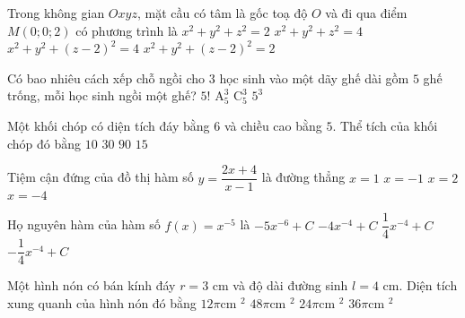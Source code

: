 \begin{ex}%
Trong không gian $Oxyz$, mặt cầu có tâm là gốc toạ độ $O$ và đi qua điểm $M(0; 0; 2)$ có phương trình là
\choice
{$x^2 + y^2 + z^2 = 2$}
{\True $x^2 + y^2 + z^2 = 4$}
{$x^2 + y^2 + (z-2)^2 = 4$}
{$x^2 + y^2 + (z-2)^2 = 2$}
\end{ex}
\begin{ex}%
Có bao nhiêu cách xếp chỗ ngồi cho $3$ học sinh vào một dãy ghế dài gồm $5$ ghế trống, mỗi học sinh ngồi một ghế?
\choice
{$5!$}
{\True $\mathrm{A}_5^3$}
{$\mathrm{C}_5^3$}
{$5^3$}
\end{ex}
\begin{ex}%
Một khối chóp có diện tích đáy bằng $6$ và chiều cao bằng $5$. Thể tích của khối chóp đó bằng
\choice
{\True $10$}
{$30$}
{$90$}
{$15$}
\end{ex}
\begin{ex}%
Tiệm cận đứng của đồ thị hàm số $y = \dfrac{2x + 4}{x - 1}$ là đường thẳng
\choice
{\True $x = 1$}
{$x =-1$}
{$x = 2$}
{$x = -4$}
\end{ex}
\begin{ex}%
Họ nguyên hàm của hàm số $f(x) = x^{-5}$ là
\choice
{$-5x^{-6} + C$}
{$-4x^{-4} + C$}
{$\dfrac{1}{4}x^{-4} + C$}
{\True $-\dfrac{1}{4}x^{-4} + C$}
\end{ex}
\begin{ex}%
Một hình nón có bán kính đáy $r = 3$ cm và độ dài đường sinh $l = 4$ cm. Diện tích xung quanh của hình nón đó bằng
\choice
{\True $12 \pi$cm $^2$}
{$48 \pi$cm $^2$}
{$24 \pi$cm $^2$}
{$36 \pi$cm $^2$}
\end{ex}
